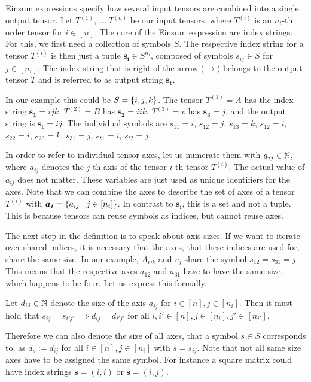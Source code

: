 \begin{definition}
    Einsum expressions specify how several input tensors are combined into a single output tensor.
    Let $T^{(1)},\dots,T^{(n)}$ be our input tensors,
    where $T^{(i)}$ is an $n_i$-th order tensor for $i \in [n]$.
    The core of the Einsum expression are index strings. For this, we first need a collection of symbols $S$.
    The respective index string for a tensor $T^{(i)}$ is then just a tuple $\bm{s_i} \in S^{n_i}$,
    composed of symbols $s_{ij} \in S$ for $j \in [n_i]$.
    The index string that is right of the arrow ($\rightarrow$) belongs to the output tensor $T$ and is referred to as output string $\bm{s_t}$.

    In our example this could be $S = \lbrace i,j,k \rbrace$.
    The tensor $T^{(1)} = A$ has the index string $\bm{s_1} = ijk$,
    $T^{(2)} = B$ has $\bm{s_2} = iik$,
    $T^{(3)} = v$ has $\bm{s_3} = j$,
    and the output string is $\bm{s_t} = ij$.
    The individual symbols are $s_{11} = i$, $s_{12} = j$, $s_{13} = k$, $s_{12} = i$, $s_{22} = i$, $s_{23} = k$, $s_{31} = j$, $s_{t1} = i$, $s_{t2} = j$.

    In order to refer to individual tensor axes, let us numerate them with $a_{ij} \in \mathbb{N}$,
    where $a_{ij}$ denotes the $j$-th axis of the tensor $i$-th tensor $T^{(i)}$.
    The actual value of $a_{ij}$ does not matter.
    These variables are just used as unique identifiers for the axes.
    Note that we can combine the axes to describe the set of axes of a tensor $T^{(i)}$ with
    $\bm{a_i} = \lbrace a_{ij} \mid j \in [n_i] \rbrace$.
    In contrast to $\bm{s_i}$, this is a set and not a tuple.
    This is because tensors can reuse symbols as indices, but cannot reuse axes.

    The next step in the definition is to speak about axis sizes.
    If we want to iterate over shared indices, it is necessary that the axes, that these indices are used for, share the same size.
    In our example, $A_{ijk}$ and $v_j$ share the symbol $s_{12} = s_{31} = j$.
    This means that the respective axes $a_{12}$ and $a_{31}$ have to have the same size, which happens to be four.
    Let us express this formally.

    Let $d_{ij} \in \mathbb{N}$ denote the size of the axis $a_{ij}$ for $i \in [n], j \in [n_i]$.
    Then it must hold that $s_{ij} = s_{i'j'} \implies d_{ij} = d_{i'j'}$ for all $i,i' \in [n], j \in [n_i], j' \in [n_{i'}]$.

    Therefore we can also denote the size of all axes, that a symbol $s \in S$ corresponds to, as $d_s := d_{ij}$ for all $i \in [n], j \in [n_i]$ with $s = s_{ij}$.
    Note that not all same size axes have to be assigned the same symbol. For instance a square matrix could have index strings $\bm{s} = (i, i)$ or $\bm{s} = (i, j)$.


\end{definition}
